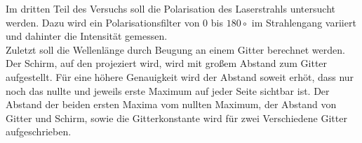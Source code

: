 Im dritten Teil des Versuchs soll die Polarisation des Laserstrahls untersucht werden.
Dazu wird ein Polarisationsfilter von $0$ bis $180\circ$ im Strahlengang variiert und dahinter die Intensität gemessen.\\

Zuletzt soll die Wellenlänge durch Beugung an einem Gitter berechnet werden.
Der Schirm, auf den projeziert wird, wird mit großem Abstand zum Gitter aufgestellt.
Für eine höhere Genauigkeit wird der Abstand soweit erhöt, dass nur noch das nullte und jeweils erste Maximum auf jeder Seite sichtbar ist.
Der Abstand der beiden ersten Maxima vom nullten Maximum, der Abstand von Gitter und Schirm, sowie die Gitterkonstante wird für zwei Verschiedene Gitter aufgeschrieben.